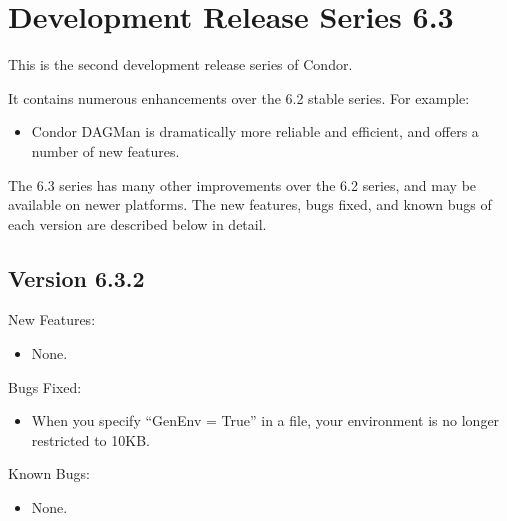 \section{\label{sec:History-6-3}Development Release Series 6.3}

This is the second development release series of Condor.

It contains numerous enhancements over the 6.2 stable series.
For example:

\begin{itemize}

\item 
Condor DAGMan is dramatically more reliable and efficient, and offers
a number of new features.

\end{itemize}

The 6.3 series has many other improvements over the 6.2 series, and
may be available on newer platforms.  The new features, bugs fixed,
and known bugs of each version are described below in detail.


\subsection{\label{sec:New-6-3-2}Version 6.3.2}

\noindent New Features:

\begin{itemize}

\item None.

\end{itemize}

\noindent Bugs Fixed:

\begin{itemize}

\item 
When you specify ``GenEnv = True'' in a  file,
your environment is no longer restricted to 10KB.

\end{itemize}

\noindent Known Bugs:

\begin{itemize}

\item None.

\end{itemize}


